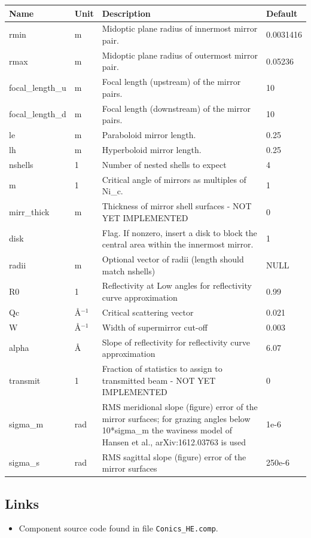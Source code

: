 \begin{longtable}{p{}p{}p{}p{}}
\toprule
\textbf{Name} & \textbf{Unit} & \textbf{Description} & \textbf{Default} \\
\midrule
\endhead
rmin & m & Midoptic plane radius of innermost mirror pair. & 0.0031416 \\
rmax & m & Midoptic plane radius of outermost mirror pair. & 0.05236 \\
focal\_length\_u & m & Focal length (upstream) of the mirror pairs. & 10 \\
focal\_length\_d & m & Focal length (downstream) of the mirror pairs. & 10 \\
le & m & Paraboloid mirror length. & 0.25 \\
lh & m & Hyperboloid mirror length. & 0.25 \\
nshells & 1 & Number of nested shells to expect & 4 \\
m & 1 & Critical angle of mirrors as multiples of Ni\_c. & 1 \\
mirr\_thick & m & Thickness of mirror shell surfaces - NOT YET IMPLEMENTED & 0 \\
disk &   & Flag. If nonzero, insert a disk to block the central area within the innermost mirror. & 1 \\
radii & m & Optional vector of radii (length should match nshells) & NULL \\
R0 & 1 & Reflectivity at Low angles for reflectivity curve approximation & 0.99 \\
Qc & \AA{}$^{-1}$ & Critical scattering vector & 0.021 \\
W & \AA{}$^{-1}$ & Width of supermirror cut-off & 0.003 \\
alpha & \AA{} & Slope of reflectivity for reflectivity curve approximation & 6.07 \\
transmit & 1 & Fraction of statistics to assign to transmitted beam - NOT YET IMPLEMENTED & 0 \\
sigma\_m & rad & RMS meridional slope (figure) error of the mirror surfaces; for grazing angles below 10*sigma\_m the waviness model of Hansen et al., arXiv:1612.03763 is used & 1e-6 \\
sigma\_s & rad & RMS sagittal slope (figure) error of the mirror surfaces & 250e-6 \\
\bottomrule
\end{longtable}

\subsection*{Links}
\begin{itemize}
  \item Component source code found in file \texttt{Conics\_HE.comp}.
\end{itemize}
